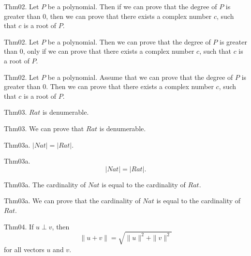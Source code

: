 \documentclass{article}
\begin{document}
Thm02. Let $P$ be a polynomial. Then if we can prove that the degree of $P$ is greater than $0$, then we can prove that there exists a complex number $c$, such that $c$ is a root of $P$.

Thm02. Let $P$ be a polynomial. Then we can prove that the degree of $P$ is greater than $0$, only if we can prove that there exists a complex number $c$, such that $c$ is a root of $P$.

Thm02. Let $P$ be a polynomial. Assume that we can prove that the degree of $P$ is greater than $0$. Then we can prove that there exists a complex number $c$, such that $c$ is a root of $P$.

Thm03. $Rat$ is denumerable.

Thm03. We can prove that $Rat$ is denumerable.

Thm03a. $| Nat | = | Rat |$.

Thm03a. $$| Nat | = | Rat |.$$

Thm03a. The cardinality of $Nat$ is equal to the cardinality of $Rat$.

Thm03a. We can prove that the cardinality of $Nat$ is equal to the cardinality of $Rat$.

Thm04. If $u \perp v$, then $$\| u + v \| = \sqrt{ \| u \| ^{ 2}+ \| v \| ^{ 2}}$$ for all vectors $u$ and $v$.
\end{document}
